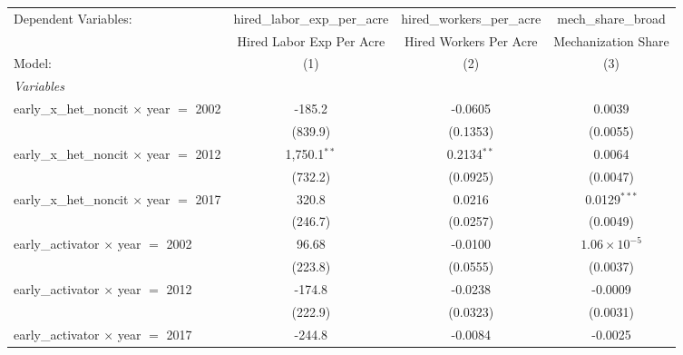 
\begingroup
\centering
\begin{tabular}{lccc}
   \tabularnewline \midrule \midrule
   Dependent Variables:                             & hired\_labor\_exp\_per\_acre     & hired\_workers\_per\_acre    & mech\_share\_broad\\    
                                                    & Hired Labor Exp Per Acre         & Hired Workers Per Acre       & Mechanization Share \\   
   Model:                                           & (1)                              & (2)                          & (3)\\  
   \midrule
   \emph{Variables}\\
   early\_x\_het\_noncit $\times$ year $=$ 2002     & -185.2                           & -0.0605                      & 0.0039\\   
                                                    & (839.9)                          & (0.1353)                     & (0.0055)\\   
   early\_x\_het\_noncit $\times$ year $=$ 2012     & 1,750.1$^{**}$                   & 0.2134$^{**}$                & 0.0064\\   
                                                    & (732.2)                          & (0.0925)                     & (0.0047)\\   
   early\_x\_het\_noncit $\times$ year $=$ 2017     & 320.8                            & 0.0216                       & 0.0129$^{***}$\\   
                                                    & (246.7)                          & (0.0257)                     & (0.0049)\\   
   early\_activator $\times$ year $=$ 2002          & 96.68                            & -0.0100                      & $1.06\times 10^{-5}$\\    
                                                    & (223.8)                          & (0.0555)                     & (0.0037)\\   
   early\_activator $\times$ year $=$ 2012          & -174.8                           & -0.0238                      & -0.0009\\   
                                                    & (222.9)                          & (0.0323)                     & (0.0031)\\   
   early\_activator $\times$ year $=$ 2017          & -244.8                           & -0.0084                      & -0.0025\\   

\end{tabular}
